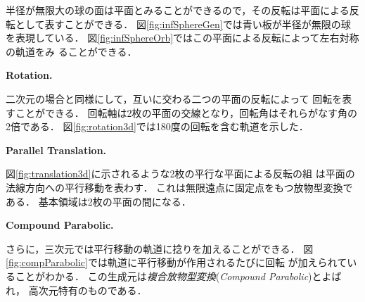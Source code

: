 半径が無限大の球の面は平面とみることができるので，その反転は平面による反
転として表すことができる．
図\ref{fig:infSphereGen}では青い板が半径が無限の球を表現している．
図\ref{fig:infSphereOrb}ではこの平面による反転によって左右対称の軌道をみ
ることができる．

\noindent\textbf{Rotation.}

二次元の場合と同様にして，互いに交わる二つの平面の反転によって
回転を表すことができる．
回転軸は2枚の平面の交線となり，回転角はそれらがなす角の2倍である．
図\ref{fig:rotation3d}では180度の回転を含む軌道を示した．

\noindent\textbf{Parallel Translation.}

図\ref{fig:translation3d}に示されるような2枚の平行な平面による反転の組
は平面の法線方向への平行移動を表わす．
これは無限遠点に固定点をもつ放物型変換である．
基本領域は2枚の平面の間になる．

\noindent\textbf{Compound Parabolic.}

さらに，三次元では平行移動の軌道に捻りを加えることができる．
図\ref{fig:compParabolic}では軌道に平行移動が作用されるたびに回転
が加えられていることがわかる．
この生成元は\emph{複合放物型変換}(\textit{Compound Parabolic})とよばれ，
高次元特有のものである．

